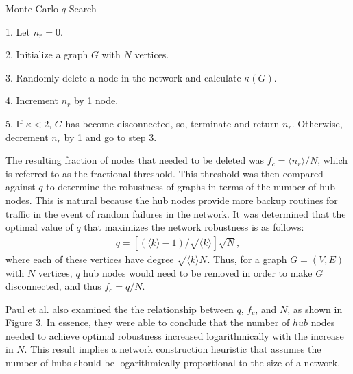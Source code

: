 \documentclass[doc]{apa}%
\begin{document}
\begin{algorithm}
\caption{Monte Carlo $q$ Search}
\label{alg1}
\begin{algorithmic}
	\item 1. Let $n_r = 0$.
	\item 2. Initialize a graph $G$ with $N$ vertices.
	\item 3. Randomly delete a node in the network and calculate $\kappa(G)$.
	\item 4. Increment $n_r$ by 1 node.
	\item 5. If $\kappa < 2$, $G$ has become disconnected, so, terminate and return $n_r$. Otherwise, decrement $n_r$ by 1 and go to step 3.
\end{algorithmic}
\end{algorithm}

The resulting fraction of nodes that needed to be deleted was $f_c = \langle n_r \rangle / N$, which is referred to as the fractional threshold. This threshold was then compared against $q$ to determine the robustness of graphs in terms of the number of hub nodes. This is natural because the hub nodes provide more backup routines for traffic in the event of random failures in the network. It was determined that the optimal value of $q$ that maximizes the network robustness is as follows:
\begin{eqnarray}
q = \left[(\langle k \rangle - 1) / \sqrt{\langle k \rangle}\right]\sqrt{N},
\end{eqnarray}
where each of these vertices have degree $\sqrt{\langle k \rangle N}$. Thus, for a graph $G = (V,E)$ with $N$ vertices, $q$ hub nodes would need to be removed in order to make $G$ disconnected, and thus $f_c = q/N$. 

Paul et al. also examined the the relationship between $q$, $f_c$, and $N$, as shown in Figure 3. In essence, they were able to conclude that the number of $hub$ nodes needed to achieve optimal robustness increased logarithmically with the increase in $N$. This result implies a network construction heuristic that assumes the number of hubs should be logarithmically proportional to the size of a network. 
\end{document}
